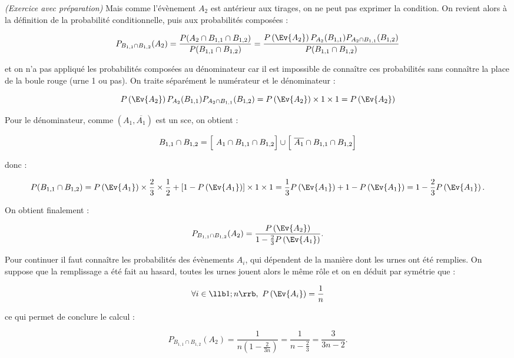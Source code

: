 \documentclass[11pt]{article}%
\begin{document}
\begin{exercice}{\it (Exercice avec préparation)}
 \noindent Mais comme l'évènement $A_{2}$ est antérieur aux tirages, on
ne peut pas exprimer la condition. On revient alors à la définition de
la probabilité conditionnelle, puis aux probabilités composées : 
 
\[
 P_{ B_{1,1} \cap B_{1,2} } ( A_{2} ) = \frac{ P ( A_{2} \cap B_{1,1}
\cap B_{1,2} ) }{ P ( B_{1,1} \cap B_{1,2} ) } = \frac{ P \left(\Ev{
A_{2} }\right) P_{A_{2}} ( B_{1,1} ) P_{ A_{2} \cap B_{1,1} } ( B_{1,2}
) }{ P ( B_{1,1} \cap B_{1,2} ) } 
\]

 \noindent et on n'a pas appliqué les probabilités composées au
dénominateur car il est impossible de connaître ces probabilités sans
connaître la place de la boule rouge (urne 1 ou pas). On traite
séparément le numérateur et le dénominateur : 
 
\[
 P \left(\Ev{ A_{2} }\right) P_{A_{2}} ( B_{1,1} ) P_{ A_{2} \cap
B_{1,1} } ( B_{1,2} ) = P \left(\Ev{ A_{2} }\right) \times 1 \times 1 =
P \left(\Ev{ A_{2} }\right) 
\]

 \noindent Pour le dénominateur, comme $(A_{1}, \overline{A_{1}})$ est
un sce, on obtient : 
 
\[
 B_{1,1} \cap B_{1,2} = \left[ \ \rule{0cm}{0.4cm} A_{1} \cap B_{1,1}
\cap B_{1,2} \right] \cup \left[ \ \rule{0cm}{0.4cm} \overline{A_{1}}
\cap B_{1,1} \cap B_{1,2} \right] 
\]

 \noindent donc : 
 
\[
 P ( B_{1,1} \cap B_{1,2} ) = P \left(\Ev{ A_{1} }\right) \times \frac{
2 }{ 3 } \times \frac{ 1 }{ 2 } + [ 1 - P \left(\Ev{A_{1} }\right) ]
\times 1 \times 1 = \frac{ 1 }{ 3 } P \left(\Ev{ A_{1} }\right) + 1 - P
\left(\Ev{ A_{1} }\right) = 1 - \frac{ 2 }{ 3 } P \left(\Ev{ A_{1}
}\right). 
\]

 On obtient finalement : 
 
\[
 P_{ B_{1,1} \cap B_{1,2} } ( A_{2} ) = \frac{ P \left(\Ev{ A_{2}
}\right) }{ 1 - \frac{ 2 }{ 3 } P \left(\Ev{ A_{1} }\right) }. 
\]

 \noindent Pour continuer il faut connaître les probabilités des
évènements $A_{i}$, qui dépendent de la manière dont les urnes ont été
remplies. On suppose que la remplissage a été fait au hasard, toutes
les urnes jouent alors le même rôle et on en déduit par symétrie que : 
 
\[
\forall i \in \llb 1 ; n \rrb, \ P \left(\Ev{ A_{i} }\right) = \frac{
  1 }{ n}
\]

 \noindent ce qui permet de conclure le calcul : 
 
\[
 P_{ B_{1,1} \cap B_{1,2} } ( A_{2} ) = \frac{ 1 }{ n \left( 1 - \frac{
2 }{ 3 n } \right) } = \frac{ 1 }{ n - \frac{ 2 }{ 3 } } = \frac{ 3 }{
3 n - 2 }. 
\]

 \end{exercice}
\end{document}
